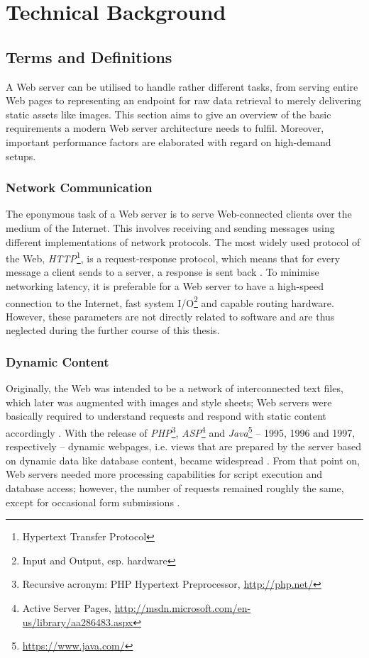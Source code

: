 \chapter{Technical Background}

\section{Terms and Definitions}

A Web server can be utilised to handle rather different tasks, from serving entire Web pages to representing an endpoint for raw data retrieval to merely delivering static assets like images. This section aims to give an overview of the basic requirements a modern Web server architecture needs to fulfil. Moreover, important performance factors are elaborated with regard on high-demand setups.

\subsection{Network Communication}
The eponymous task of a Web server is to serve Web-connected clients over the medium of the Internet. This involves receiving and sending messages using different implementations of network protocols. The most widely used protocol of the Web, \textit{HTTP}\footnote{Hypertext Transfer Protocol}, is a request-response protocol, which means that for every message a client sends to a server, a response is sent back \cite{http}. To minimise networking latency, it is preferable for a Web server to have a high-speed connection to the Internet, fast system I/O\footnote{\label{lab:io}Input and Output, esp. hardware} and capable routing hardware. However, these parameters are not directly related to software and are thus neglected during the further course of this thesis.

\subsection{Dynamic Content}
Originally, the Web was intended to be a network of interconnected text files, which later was augmented with images and style sheets; Web servers were basically required to understand requests and respond with static content accordingly \cite{http}. With the release of \textit{PHP}\footnote{Recursive acronym: PHP Hypertext Preprocessor, \url{http://php.net/}}, \textit{ASP}\footnote{Active Server Pages, \url{http://msdn.microsoft.com/en-us/library/aa286483.aspx}} and \textit{Java}\footnote{\url{https://www.java.com/}} -- 1995, 1996 and 1997, respectively -- dynamic webpages, i.e. views that are prepared by the server based on dynamic data like database content, became widespread \cite{webhistory}. From that point on, Web servers needed more processing capabilities for script execution and database access; however, the number of requests remained roughly the same, except for occasional form submissions \cite{webhistory}.


